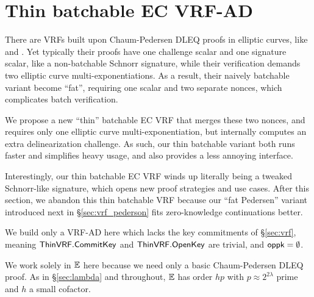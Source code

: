\section{Thin batchable EC VRF-AD}
\label{sec:vrf_thin}

There are VRFs built upon Chaum-Pedersen DLEQ proofs in elliptic curves,
 like \cite{nsec5} and \cite{VXEd25519}.
Yet typically their proofs have one challenge scalar and one signature
scalar, like a non-batchable Schnorr signature, while 
their verification demands two elliptic curve multi-exponentiations.
As a result, their naively batchable variant become ``fat'', requiring
one scalar and two separate nonces, which complicates batch verification.

We propose a new ``thin'' batchable EC VRF that merges these two nonces,
and requires only one elliptic curve multi-exponentiation, but
internally computes an extra delinearization challenge.
As such, our thin batchable variant both runs faster and simplifies heavy usage,
and also provides a less annoying interface.

Interestingly, our thin batchable EC VRF winds up literally being
a tweaked Schnorr-like signature, which opens new proof strategies and
use cases.  After this section, we abandon this thin batchable VRF
because our ``fat Pedersen'' variant introduced next in \S\ref{sec:vrf_pederson}
fits zero-knowledge continuations better.

\smallskip

\newcommand{\ThinVRF}{\primalgo{ThinVRF}} 


We build only a VRF-AD here which lacks the key commitments of \S\ref{sec:vrf},
meaning $\ThinVRF.\CommitKey$ and $\ThinVRF.\OpenKey$ are trivial, and $\mathsf{oppk} = \emptyset$.

We work solely in ${\mathbb{E}}$ here because we need only a basic Chaum-Pedersen DLEQ proof.
As in \S\ref{sec:lambda} and throughout,
 ${\mathbb{E}}$ has order $h p$ with $p \approx 2^{2\lambda}$ prime and $h$ a small cofactor.

